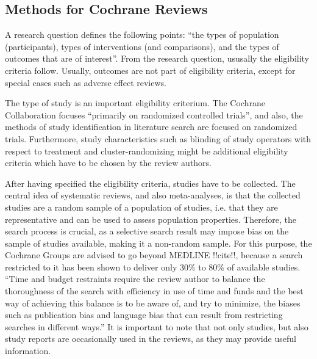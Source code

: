 \documentclass[11pt,a4paper,twoside]{book}\usepackage[]{graphicx}\usepackage[]{color}
\begin{document}
\subsection{Methods for Cochrane Reviews}
A research question defines the following points: ``the types of population (participants), types of interventions (and comparisons), and the types of outcomes that are of interest''. From the research question, ususally the eligibility criteria follow. Usually, outcomes are not part of eligibility criteria, except for special cases such as adverse effect reviews.

\vspace{0mm}
The type of study is an important eligibility criterium. The Cochrane Collaboration focuses ``primarily on randomized controlled trials'', and also, the methods of study identification in literature search are focused on randomized trials. Furthermore, study characteristics such as blinding of study operators with respect to treatment and cluster-randomizing might be additional eligibility criteria which have to be chosen by the review authors.

\vspace{0mm}
After having specified the eligibility criteria, studies have to be collected. The central idea of systematic reviews, and also meta-analyses, is that the collected studies are a random sample of a population of studies, i.e. that they are representative and can be used to assess population properties. Therefore, the search process is crucial, as a selective search result may impose bias on the sample of studies available, making it a non-random sample. For this purpose, the Cochrane Groups are advised to go beyond MEDLINE !!cite!!, because a search restricted to it has been shown to deliver only 30\% to 80\% of available studies. ``Time and budget restraints require the review author to balance the thoroughness of the search with efficiency in use of time and funds and the best way of achieving this balance is to be aware of, and try to minimize, the biases such as publication bias and language bias that can result from restricting searches in different ways.'' It is important to note that not only studies, but also study reports are occasionally used in the reviews, as they may provide useful information.
\end{document}
